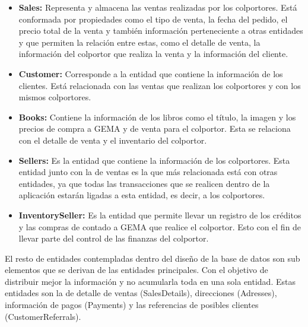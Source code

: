 \documentclass[runningheads]{llncs}
\begin{document}
                \begin{itemize}
                    \item \textbf{Sales: }Representa y almacena las ventas realizadas por los colportores. Está conformada por propiedades como el tipo de venta, la fecha del pedido, el precio total de la venta y también información perteneciente a otras entidades y que permiten la relación entre estas, como el detalle de venta, la información del colportor que realiza la venta y la información del cliente.
                    \item \textbf{Customer: }Corresponde a la entidad que contiene la información de los clientes. Está relacionada con las ventas que realizan los colportores y con los mismos colportores.
                    \item \textbf{Books: }Contiene la información de los libros como el título, la imagen y los precios de compra a GEMA y de venta para el colportor. Esta se relaciona con el detalle de venta y el inventario del colportor.
                    \item \textbf{Sellers: }Es la entidad que contiene la información de los colportores. Esta entidad junto con la de ventas es la que más relacionada está con otras entidades, ya que todas las transacciones que se realicen dentro de la aplicación estarán ligadas a esta entidad, es decir, a los colportores.
                    \item \textbf{InventorySeller: }Es la entidad que permite llevar un registro de los créditos y las compras de contado a GEMA que realice el colportor. Esto con el fin de llevar parte del control de las finanzas del colportor.
                \end{itemize}
                El resto de entidades contempladas dentro del diseño de la base de datos son sub elementos que se derivan de las entidades principales. Con el objetivo de distribuir mejor la información y no acumularla toda en una sola entidad.
                Estas entidades son la de detalle de ventas (SalesDetails), direcciones (Adresses), información de pagos (Payments) y las referencias de posibles clientes (CustomerReferrals).
\end{document}
